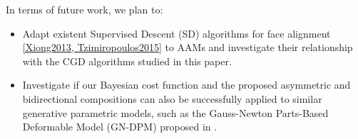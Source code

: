 In terms of future work, we plan to:
\begin{itemize}
	\item Adapt existent Supervised Descent (SD) algorithms for face alignment \ref{Xiong2013, Tzimiropoulos2015} to AAMs and investigate their relationship with the CGD algorithms studied in this paper. 
	
	\item Investigate if our Bayesian cost function and the proposed asymmetric and bidirectional compositions can also be successfully applied to similar generative parametric models, such as the Gauss-Newton Parts-Based Deformable Model (GN-DPM) proposed in \cite{Tzimiropoulos2014}.   
\end{itemize} 